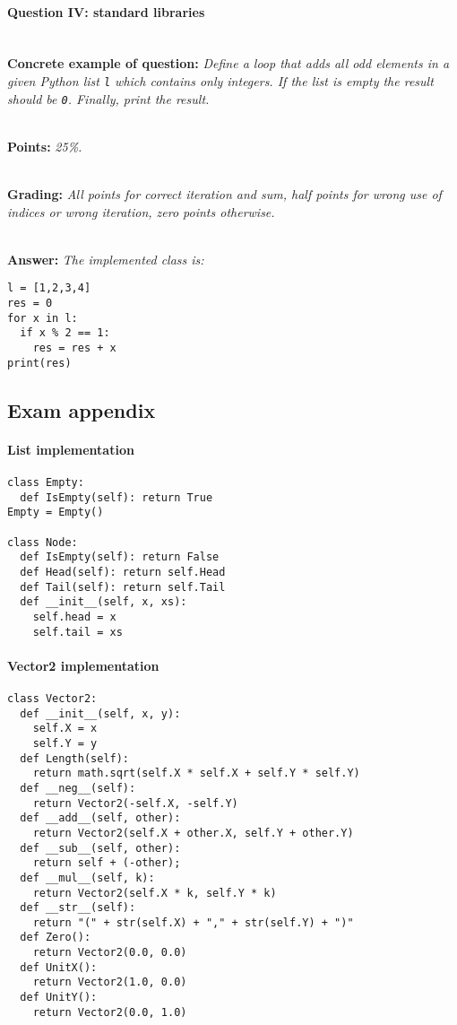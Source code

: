 \paragraph{Question IV: standard libraries} \ \\

\textbf{Concrete example of question:} \textit{Define a loop that adds all odd elements in a given Python list \texttt{l} which contains only integers. If the list is empty the result should be \texttt{0}. Finally, print the result.}

\ \\ 

\textbf{Points:} \textit{25\%.}

\ \\ 

\textbf{Grading:} \textit{All points for correct iteration and sum, half points for wrong use of indices or wrong iteration, zero points otherwise.}

\ \\ 

\textbf{Answer:} \textit{The implemented class is:}

\begin{lstlisting}
l = [1,2,3,4]
res = 0
for x in l:
  if x % 2 == 1:
    res = res + x
print(res)
\end{lstlisting}

\subsection{Exam appendix}

\paragraph{List implementation}
\begin{lstlisting}
class Empty:
  def IsEmpty(self): return True
Empty = Empty()

class Node:
  def IsEmpty(self): return False
  def Head(self): return self.Head
  def Tail(self): return self.Tail
  def __init__(self, x, xs):
    self.head = x
    self.tail = xs
\end{lstlisting}

\paragraph{Vector2 implementation}
\begin{lstlisting}
class Vector2:
  def __init__(self, x, y):
    self.X = x
    self.Y = y
  def Length(self):
    return math.sqrt(self.X * self.X + self.Y * self.Y)
  def __neg__(self):
    return Vector2(-self.X, -self.Y)
  def __add__(self, other):
    return Vector2(self.X + other.X, self.Y + other.Y)
  def __sub__(self, other):
    return self + (-other);
  def __mul__(self, k):
    return Vector2(self.X * k, self.Y * k)
  def __str__(self):
    return "(" + str(self.X) + "," + str(self.Y) + ")"
  def Zero(): 
    return Vector2(0.0, 0.0)
  def UnitX(): 
    return Vector2(1.0, 0.0)
  def UnitY(): 
    return Vector2(0.0, 1.0)
\end{lstlisting}
